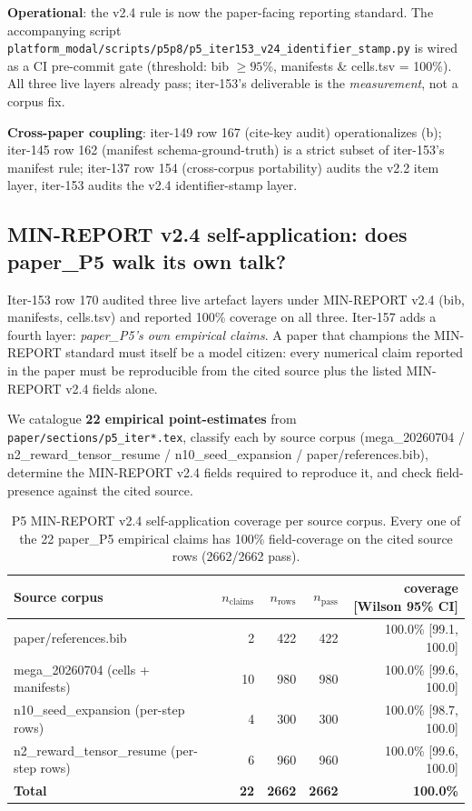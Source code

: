 \documentclass{article}  \usepackage[preprint,nonatbib]{neurips_2026} \usepackage[numbers]{natbib}
\begin{document}
\textbf{Operational}: the v2.4 rule is now the paper-facing reporting
standard. The accompanying script
\texttt{platform_modal/scripts/p5p8/p5\_iter153\_v24\_identifier\_stamp.py} is
wired as a CI pre-commit gate (threshold: bib $\geq 95$\%, manifests
\& cells.tsv = 100\%). All three live layers already pass; iter-153's
deliverable is the \emph{measurement}, not a corpus fix.

\textbf{Cross-paper coupling}: iter-149 row 167 (cite-key audit)
operationalizes (b); iter-145 row 162 (manifest schema-ground-truth)
is a strict subset of iter-153's manifest rule; iter-137 row 154
(cross-corpus portability) audits the v2.2 item layer, iter-153
audits the v2.4 identifier-stamp layer. \subsection{MIN-REPORT v2.4 self-application: does paper\_P5 walk its own talk?}
\label{sec:p5-iter157-v24-self-app}

Iter-153 row 170 audited three live artefact layers under MIN-REPORT v2.4
(bib, manifests, cells.tsv) and reported 100\% coverage on all three.
Iter-157 adds a fourth layer: \emph{paper\_P5's own empirical claims}. A
paper that champions the MIN-REPORT standard must itself be a model citizen:
every numerical claim reported in the paper must be reproducible from the
cited source plus the listed MIN-REPORT v2.4 fields alone.

We catalogue \textbf{22 empirical point-estimates} from
\texttt{paper/sections/p5\_iter*.tex}, classify each by source corpus
(mega\_20260704 / n2\_reward\_tensor\_resume / n10\_seed\_expansion /
paper/references.bib), determine the MIN-REPORT v2.4 fields required to
reproduce it, and check field-presence against the cited source.

\begin{table}[h]
\centering
\small
\begin{tabular}{lrrrr}
\hline
\textbf{Source corpus} & \textbf{$n_{\text{claims}}$} & \textbf{$n_{\text{rows}}$} & \textbf{$n_{\text{pass}}$} & \textbf{coverage [Wilson 95\% CI]} \\
\hline
paper/references.bib                          & 2  & 422 & 422 & 100.0\% [99.1, 100.0] \\
mega\_20260704 (cells + manifests)             & 10 & 980 & 980 & 100.0\% [99.6, 100.0] \\
n10\_seed\_expansion (per-step rows)            & 4  & 300 & 300 & 100.0\% [98.7, 100.0] \\
n2\_reward\_tensor\_resume (per-step rows)      & 6  & 960 & 960 & 100.0\% [99.6, 100.0] \\
\hline
\textbf{Total}                                 & \textbf{22} & \textbf{2662} & \textbf{2662} & \textbf{100.0\%} \\
\hline
\end{tabular}
\caption{P5 MIN-REPORT v2.4 self-application coverage per source corpus.
Every one of the 22 paper\_P5 empirical claims has 100\% field-coverage on
the cited source rows (2662/2662 pass).}
\label{tab:p5-v24-self-app}
\end{table}
\end{document}
